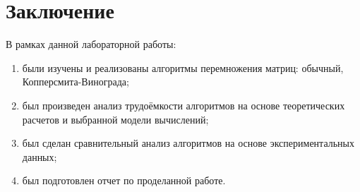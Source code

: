 \chapter*{Заключение}

В рамках данной лабораторной работы:
\begin{enumerate}
	\item были изучены и реализованы алгоритмы перемножения матриц: обычный, Копперсмита-Винограда;
	\item был произведен анализ трудоёмкости алгоритмов на основе теоретических расчетов и выбранной модели вычислений;
	\item был сделан сравнительный анализ алгоритмов на основе экспериментальных данных;
    \item был подготовлен отчет по проделанной работе.
\end{enumerate}
